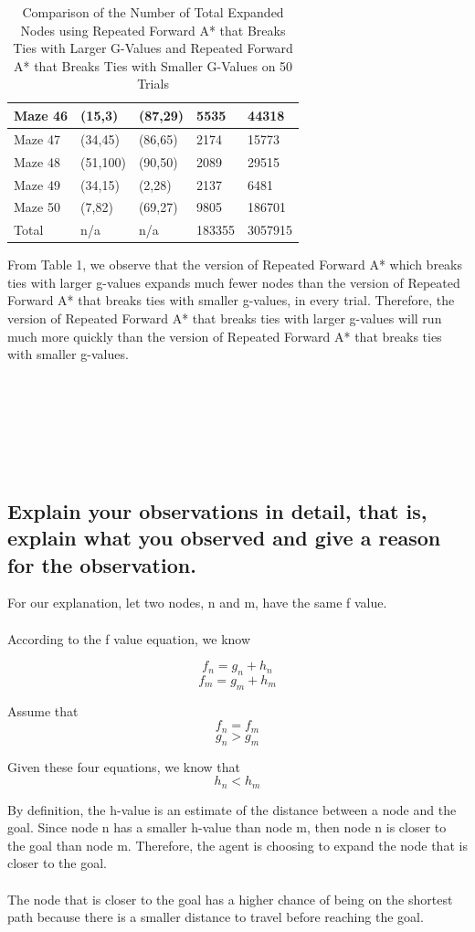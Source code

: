 \documentclass{article}
\begin{document}
\begin{table}
{\begin{tabular}{||p{1.5cm}|p{1.5cm}|p{1.5cm}|p{3.5cm}|p{3.5cm}||}
 \hline
 Maze 46 & (15,3) & (87,29) & 5535 & 44318 \\
 \hline
 Maze 47 &  (34,45) & (86,65)& 2174 & 15773\\ 
 \hline
 Maze 48 & (51,100) & (90,50)  & 2089 & 29515\\
 \hline
 Maze 49 & (34,15) & (2,28) & 2137 & 6481\\
 \hline
 Maze 50 & (7,82) & (69,27) & 9805 & 186701\\
\hline
Total & n/a & n/a & 183355 & 3057915
\\[.3ex]
 \hline
\end{tabular}}
\caption{Comparison of the Number of Total Expanded Nodes using Repeated Forward A* that Breaks Ties with Larger G-Values and Repeated Forward A* that Breaks Ties with Smaller G-Values on 50 Trials } 
\end{table} 

From Table 1, we observe that the version of Repeated Forward A* which breaks ties with larger g-values expands much fewer nodes than the version of Repeated Forward A* that breaks ties with smaller g-values, in every trial. Therefore, the version of Repeated Forward A* that breaks ties with larger g-values will run much more quickly than the version of Repeated Forward A* that breaks ties with smaller g-values.\\\\\\\\\\\\\\

\subsection{Explain your observations in detail, that is, explain what you observed and give a reason for the observation.}

For our explanation, let two nodes, n and m, have the same f value.\\\\
According to the f value equation, we know

\[f_n = g_n + h_n \]
\[f_m = g_m + h_m \]

Assume that
\[f_n = f_m \]
\[g_n > g_m \]

Given these four equations, we know that
\[h_n<h_m\]

By definition, the h-value is an estimate of the distance between a node and the goal. Since node n has a smaller h-value than node m, then node n is closer to the goal than node m. Therefore, the agent is choosing to expand the node that is closer to the goal.\\\\
The node that is closer to the goal has a higher chance of being on the shortest path because there is a smaller distance to travel before reaching the goal.
\end{document}
